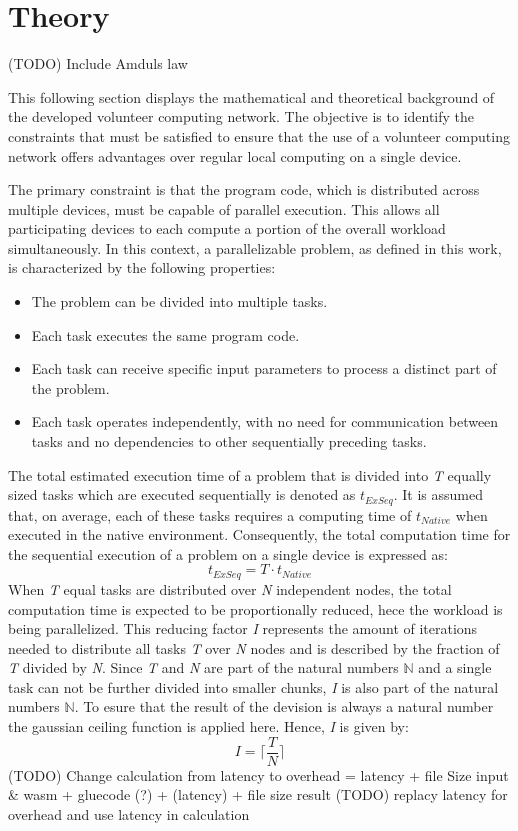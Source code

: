 \section{Theory}
\label{sec:concept:theory}
(TODO) Include Amduls law 

This following section displays the mathematical and theoretical background of the developed volunteer computing network. The objective is to identify the constraints that must be satisfied to ensure that the use of a volunteer computing network offers advantages over regular local computing on a single device.

The primary constraint is that the program code, which is distributed across multiple devices, must be capable of parallel execution. This allows all participating devices to  each compute a portion of the overall workload simultaneously. In this context, a parallelizable problem, as defined in this work, is characterized by the following properties:
\begin{itemize}
  \item The problem can be divided into multiple tasks.
  \item Each task executes the same program code.
  \item Each task can receive specific input parameters to process a distinct part of the problem.
  \item Each task operates independently, with no need for communication between tasks and no dependencies to other sequentially preceding tasks.
\end{itemize}
The total estimated execution time of a problem that is divided into \emph{T} equally sized tasks which are executed sequentially is denoted as $t_{ExSeq}$. It is assumed that, on average, each of these tasks requires a computing time of $t_{Native}$ when executed in the native environment. Consequently, the total computation time for the sequential execution of a problem on a single device is expressed as:
\begin{equation}
  t_{ExSeq} = T \cdot t_{Native}
  \label{equ:single}
\end{equation}
When \emph{T} equal tasks are distributed over \emph{N} independent nodes, the total computation time is expected to be proportionally reduced, hece the workload is being parallelized. This reducing factor \emph{I} represents the amount of iterations needed to distribute all tasks \emph{T} over \emph{N} nodes and is described by the fraction of \emph{T} divided by \emph{N}. Since \emph{T} and \emph{N} are part of the natural numbers $\mathbb{N}$ and a single task can not be further divided into smaller chunks, \emph{I} is also part of the natural numbers $\mathbb{N}$. To esure that the result of the devision is always a natural number the gaussian ceiling function is applied here. Hence, \emph{I} is given by: 
\begin{equation}
  I = \bigg\lceil\frac{T}{N}\bigg\rceil
  \label{equ:frac}
\end{equation}
(TODO) Change calculation from latency to overhead = latency + file Size input \& wasm + gluecode (?) + (latency) + file size result
(TODO) replacy latency for overhead and use latency in calculation

